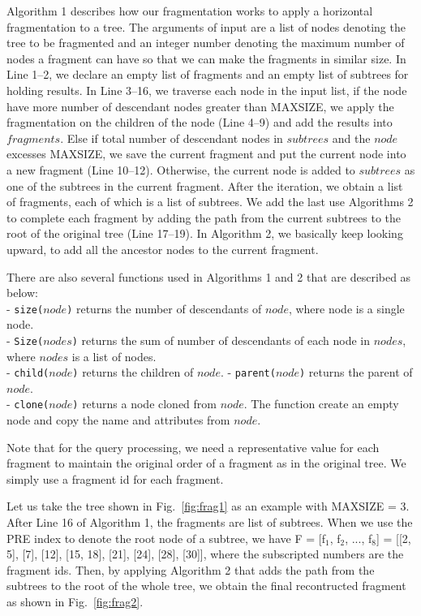 Algorithm 1 describes how our fragmentation works to apply a horizontal
fragmentation to a tree. The arguments of input are a list of nodes denoting the
tree to be fragmented and an integer number denoting the maximum number of nodes
a fragment can have so that we can make the fragments in similar size.   In Line
1--2, we declare an empty list of fragments and an empty list of subtrees for
holding results. In Line 3--16, we traverse each node in the input list, if the
node have more number of descendant nodes greater than MAXSIZE, we apply the
fragmentation on the children of the node (Line 4--9) and add the results into
$fragments$. Else if total number of descendant nodes in $subtrees$ and the
$node$ excesses MAXSIZE, we save the current fragment and put the current node
into a new fragment (Line 10--12). Otherwise, the current node is added to
$subtrees$ as one of the subtrees in the current fragment. After the iteration,
we obtain a list of fragments, each of which is a list of subtrees. We add the
last use Algorithms 2 to complete each fragment by adding the path from the
current subtrees to the root of the original tree (Line 17--19). In Algorithm 2,
we basically keep looking upward, to add all the ancestor nodes to the current
fragment.

There are also several functions used in Algorithms 1 and 2 that are described 
as below:\\
- \texttt{size($node$)} returns the number of descendants of $node$, where node
is a single node.\\
- \texttt{Size($nodes$)} returns the sum of number of descendants of each node
in $nodes$, where $nodes$ is a list of nodes.\\
- \texttt{child($node$)} returns the children of $node$.
- \texttt{parent($node$)} returns the parent of $node$.\\
- \texttt{clone($node$)} returns a node cloned from $node$. The function create
an empty node and copy the name and attributes from $node$.

Note that for the query processing, we need a representative value for each
fragment to maintain the original order of a fragment as in the original tree.
We simply use a fragment id for each fragment.

Let us take the tree shown in Fig.~\ref{fig:frag1} as an example with MAXSIZE =
3. After Line 16 of Algorithm 1, the fragments are list of subtrees. When we use
the PRE index to denote the root node of a subtree, we have F = [f$_1$, f$_2$, ...,
f$_8$] = [[2, 5], [7], [12], [15, 18], [21], [24], [28], [30]], where the
subscripted numbers are the fragment ids. Then, by applying Algorithm 2 that adds
the path from the subtrees to the root of the whole tree, we obtain the final
recontructed fragment as shown in Fig.~\ref{fig:frag2}.

